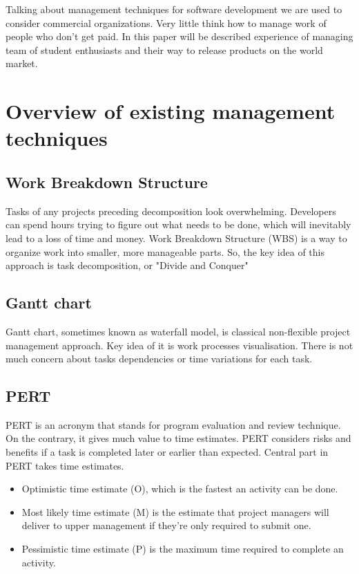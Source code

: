 \documentclass[conference]{IEEEtran}
\begin{document}
    Talking about management techniques for software development we are used to consider commercial organizations.
    Very little think how to manage work of people who don't get paid.
    In this paper will be described experience of managing team of student enthusiasts and their way to release products on the world market.
    \section{Overview of existing management techniques}\label{sec:overview-of-existing-management-techniques}

    \subsection{Work Breakdown Structure}\label{subsec:work-breakdown-structure}

    Tasks of any projects preceding decomposition look overwhelming.
    Developers can spend hours trying to figure out what needs to be done, which will inevitably lead to a loss of time and money.
    Work Breakdown Structure (WBS) is a way to organize work into smaller, more manageable parts.
    So, the key idea of this approach is task decomposition, or "Divide and Conquer"

    \subsection{Gantt chart}\label{subsec:gantt-chart}
    Gantt chart, sometimes known as waterfall model, is classical non-flexible project management approach.
    Key idea of it is work processes visualisation.
    There is not much concern about tasks dependencies or time variations for each task.

    \subsection{PERT}\label{subsec:pert}
    PERT is an acronym that stands for program evaluation and review technique.\cite{b5}
    On the contrary, it gives much value to time estimates.
    PERT considers risks and benefits if a task is completed later or earlier than expected.
    Central part in PERT takes time estimates.
    \begin{itemize}
        \item Optimistic time estimate (O), which is the fastest an activity can be done.
        \item Most likely time estimate (M) is the estimate that project managers will deliver to upper management if they're only required to submit one.
        \item Pessimistic time estimate (P) is the maximum time required to complete an activity.
    \end{itemize}
\end{document}
